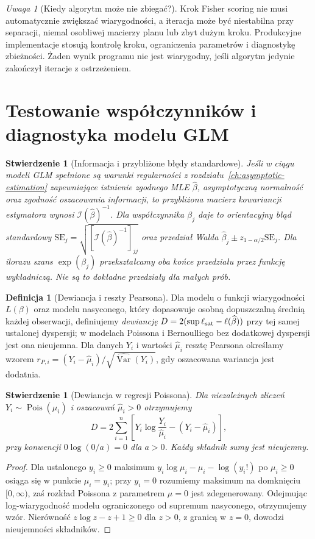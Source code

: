 \documentclass[11pt,a4paper,oneside]{report}
\numberwithin{equation}{chapter}
\theoremstyle{plain}
\newtheorem{stwierdzenie}[twierdzenie]{Stwierdzenie}
\theoremstyle{definition}
\newtheorem{definicja}{Definicja}[chapter]
\theoremstyle{remark}
\newtheorem{uwaga}{Uwaga}[chapter]
\newcommand{\Var}{\operatorname{Var}}
\DeclareMathOperator{\Pois}{Pois}
\begin{document}
\begin{uwaga}[Kiedy algorytm może nie zbiegać?]
Krok Fisher scoring nie musi automatycznie zwiększać
wiarygodności, a iteracja może być niestabilna przy
separacji, niemal osobliwej macierzy planu lub zbyt
dużym kroku. Produkcyjne implementacje stosują
kontrolę kroku, ograniczenia parametrów i diagnostykę
zbieżności. Żaden wynik programu nie jest wiarygodny,
jeśli algorytm jedynie zakończył iteracje z ostrzeżeniem.
\end{uwaga}

\section{Testowanie współczynników i diagnostyka modelu GLM}
\begin{stwierdzenie}[Informacja i przybliżone błędy standardowe]
\label{prop:glm-asymptotic-se}
Jeśli w ciągu modeli GLM spełnione są warunki
regularności z rozdziału~\ref{ch:asymptotic-estimation} zapewniające
istnienie zgodnego MLE $\widehat\beta$, asymptotyczną
normalność oraz zgodność oszacowania informacji,
to przybliżona macierz kowariancji estymatora wynosi
$\mathcal I(\widehat\beta)^{-1}$. Dla współczynnika
$\beta_j$ daje to orientacyjny błąd standardowy
$\mathrm{SE}_j=\sqrt{[\mathcal I(\widehat\beta)^{-1}]_{jj}}$
oraz przedział Walda $\widehat\beta_j\pm
z_{1-\alpha/2}\mathrm{SE}_j$.
Dla ilorazu szans $\exp(\beta_j)$ przekształcamy
\emph{oba końce} przedziału przez funkcję wykładniczą.
Nie są to dokładne przedziały dla małych prób.
\end{stwierdzenie}

\begin{definicja}[Dewiancja i reszty Pearsona]
Dla modelu o funkcji wiarygodności $L(\beta)$ oraz
modelu nasyconego, który dopasowuje osobną dopuszczalną
średnią każdej obserwacji, definiujemy \emph{dewiancję}
$D=2(\sup\ell_{\rm sat}-\ell(\widehat\beta))$
przy tej samej ustalonej dyspersji; w modelach
Poissona i Bernoulliego bez dodatkowej dyspersji
jest ona nieujemna. Dla danych $Y_i$ i wartości
$\widehat\mu_i$ resztę Pearsona określamy wzorem
$r_{P,i}=(Y_i-\widehat\mu_i)/\sqrt{\widehat{\Var}(Y_i)}$,
gdy oszacowana wariancja jest dodatnia.
\end{definicja}

\begin{stwierdzenie}[Dewiancja w regresji Poissona]
\label{prop:poisson-deviance}
Dla niezależnych zliczeń $Y_i\sim\Pois(\mu_i)$ i
oszacowań $\widehat\mu_i>0$ otrzymujemy
\[
 D=2\sum_{i=1}^n\left[
 Y_i\log\frac{Y_i}{\widehat\mu_i}
 -(Y_i-\widehat\mu_i)\right],
\]
przy konwencji $0\log(0/a)=0$ dla $a>0$.
Każdy składnik sumy jest nieujemny.
\end{stwierdzenie}
\begin{proof}
Dla ustalonego $y_i\ge0$ maksimum
$y_i\log\mu_i-\mu_i-\log(y_i!)$
po $\mu_i\ge0$ osiąga się w punkcie $\mu_i=y_i$;
przy $y_i=0$ rozumiemy maksimum na domknięciu
$[0,\infty)$, zaś rozkład Poissona z parametrem
$\mu=0$ jest zdegenerowany. Odejmując log-wiarygodność
modelu ograniczonego od supremum nasyconego, otrzymujemy wzór.
Nierówność $z\log z-z+1\ge0$ dla $z>0$,
z granicą w $z=0$, dowodzi nieujemności składników.
\end{proof}
\end{document}
